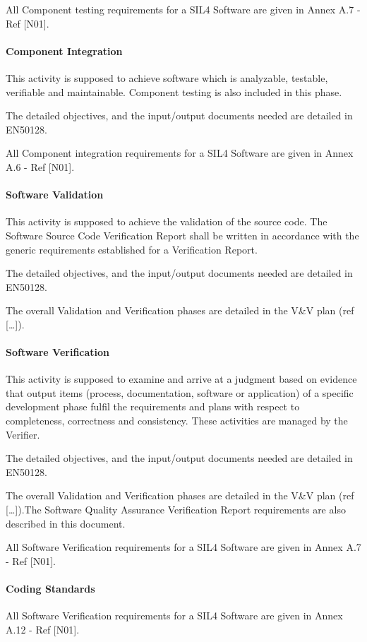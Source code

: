 \documentclass{template/openetcs_article}
\begin{document}
All Component testing requirements for a SIL4 Software are given in Annex A.7 - Ref [N01].

\paragraph{Component Integration}
This activity is supposed to achieve software which is analyzable, testable, verifiable and maintainable. Component testing is also included in this phase.

The detailed objectives, and the input/output documents needed are detailed in EN50128.

All Component integration requirements for a SIL4 Software are given in Annex A.6 - Ref [N01].

\paragraph{Software Validation}
This activity is supposed to achieve the validation of the source code. The Software Source Code Verification Report shall be written in accordance with the generic requirements established for a Verification Report.

The detailed objectives, and the input/output documents needed are detailed in EN50128.

The overall Validation and Verification phases are detailed in the V\&V plan (ref [{\dots}]).


\paragraph{Software Verification}
This activity is supposed to examine and arrive at a judgment based on evidence that output items (process, documentation, software or application) of a specific development phase fulfil the requirements and plans with respect to completeness, correctness and consistency. These activities are managed by the Verifier.

The detailed objectives, and the input/output documents needed are detailed in EN50128.

The overall Validation and Verification phases are detailed in the V\&V plan (ref [{\dots}]).The Software Quality Assurance Verification Report requirements are also described in this document.

All Software Verification requirements for a SIL4 Software are given in Annex A.7 - Ref [N01].


\paragraph{Coding Standards}
All Software Verification requirements for a SIL4 Software are given in Annex A.12 - Ref [N01].
\end{document}
